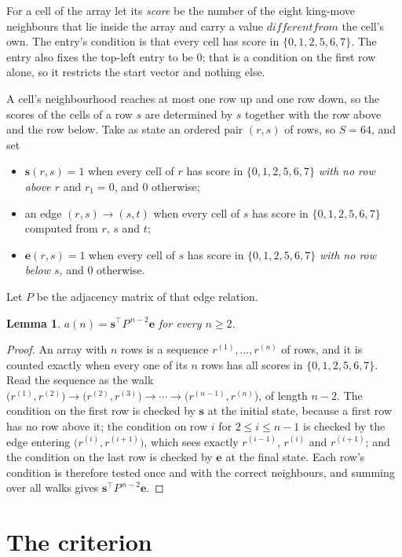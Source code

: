 \documentclass[11pt,a4paper]{article}
\theoremstyle{plain}
\newtheorem{lemma}[theorem]{Lemma}
\theoremstyle{definition}
\begin{document}
For a cell of the array let its \emph{score} be the number of the eight king-move neighbours that lie inside
the array and carry a value $different from$ the cell's own. The entry's condition is that every cell
has score in $\{0,1,2,5,6,7\}$. The entry also fixes the top-left entry to be $0$; that is a condition on the first row alone, so it restricts the start vector and nothing else.

A cell's neighbourhood reaches at most one row up and one row down, so the scores of the
cells of a row $s$ are determined by $s$ together with the row above and the row below.
Take as state an ordered pair $(r,s)$ of rows, so $S=64$, and set
\begin{itemize}
\item $\mathbf{s}(r,s)=1$ when every cell of $r$ has score in $\{0,1,2,5,6,7\}$ \emph{with no row
above $r$} and $r_1=0$, and $0$ otherwise;
\item an edge $(r,s)\to(s,t)$ when every cell of $s$ has score in $\{0,1,2,5,6,7\}$ computed from
$r$, $s$ and $t$;
\item $\mathbf{e}(r,s)=1$ when every cell of $s$ has score in $\{0,1,2,5,6,7\}$ \emph{with no row
below $s$}, and $0$ otherwise.
\end{itemize}
Let $P$ be the adjacency matrix of that edge relation.

\begin{lemma}\label{lem:walk}
$a(n)=\mathbf{s}^{\!\top}P^{\,n-2}\mathbf{e}$ for every $n\ge2$.
\end{lemma}

\begin{proof}
An array with $n$ rows is a sequence $r^{(1)},\dots,r^{(n)}$ of rows, and it is counted
exactly when every one of its $n$ rows has all scores in $\{0,1,2,5,6,7\}$. Read the sequence as the
walk $\bigl(r^{(1)},r^{(2)}\bigr)\to\bigl(r^{(2)},r^{(3)}\bigr)\to\cdots\to
\bigl(r^{(n-1)},r^{(n)}\bigr)$, of length $n-2$. The condition on the first row is
checked by $\mathbf{s}$ at the initial state, because a first row has no row above it; the
condition on row $i$ for $2\le i\le n-1$ is checked by the edge entering
$\bigl(r^{(i)},r^{(i+1)}\bigr)$, which sees exactly $r^{(i-1)}$, $r^{(i)}$ and
$r^{(i+1)}$; and the condition on the last row is checked by $\mathbf{e}$ at the final
state. Each row's condition is therefore tested once and with the correct neighbours, and
summing over all walks gives $\mathbf{s}^{\!\top}P^{\,n-2}\mathbf{e}$.
\end{proof}

\section{The criterion}
\end{document}
